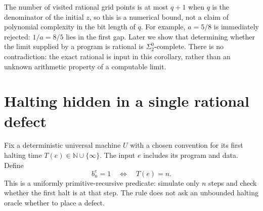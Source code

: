 \documentclass[11pt,letterpaper]{article}
\numberwithin{equation}{section}
\theoremstyle{definition}
\theoremstyle{remark}
\newcommand{\N}{\mathbb N}
\newcommand{\srcmark}[1]{\par\noindent{\small\itshape [source~#1]}\par}
\begin{document}
The number of visited rational grid points is at most $q+1$ when
$q$ is the denominator of the initial $z$, so this is a numerical
bound, not a claim of polynomial complexity in the bit length of $q$.
For example, $a=5/8$ is immediately rejected: $1/a=8/5$ lies in the
first gap. Later we show that determining whether the limit supplied
by a program is rational is $\Sigma^0_2$-complete. There is no
contradiction: the exact rational is input in this corollary, rather
than an unknown arithmetic property of a computable limit.

\section{Halting hidden in a single rational defect}
\label{pqc:rv:sec:halting}
\srcmark{17}
Fix a deterministic universal machine $U$ with a chosen convention for
its first halting time $T(e)\in\N\cup\{\infty\}$. The input $e$
includes its program and data. Define
\begin{equation}\label{pqc:rv:eq:halt-bit}
 b^e_n=1\quad\Longleftrightarrow\quad T(e)=n.
\end{equation}
This is a uniformly primitive-recursive predicate: simulate only $n$
steps and check whether the first halt is at that step. The rule does
not ask an unbounded halting oracle whether to place a defect.
\end{document}
